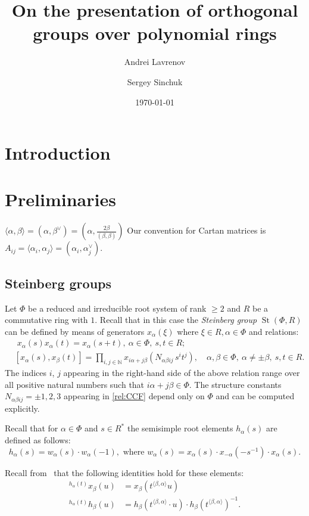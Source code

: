 \documentclass[oneside, 8pt]{amsart}
\title{On the presentation of orthogonal groups over polynomial rings}
\author{Andrei Lavrenov}
\author {Sergey Sinchuk}
\date {\today}
\theoremstyle{remark}
\theoremstyle{definition}
\DeclareMathOperator{\St}{St}
\numberwithin{equation}{section}
\begin{document}
\maketitle
\section{Introduction}


\section{Preliminaries}
$\langle \alpha, \beta \rangle = (\alpha, \beta^\vee) = (\alpha, \frac{2\beta}{(\beta, \beta)})$
Our convention for Cartan matrices is 
$A_{ij} = \langle \alpha_i, \alpha_j \rangle = (\alpha_i, \alpha_j^\vee)$.

\subsection{Steinberg groups}
Let $\Phi$ be a reduced and irreducible root system of rank $\geq 2$ and $R$ be a commutative ring with $1$. Recall that in this case the \emph{Steinberg group} $\St(\Phi, R)$ can be defined by means of generators $x_{\alpha}(\xi)$ where $\xi\in R, \alpha\in\Phi$ and relations:
\begin{align}
& \phantom{[}
x_\alpha(s) x_\alpha(t) = x_\alpha(s+t),\ \alpha\in\Phi,\ s,t\in R; \label{rel:add}\\
& [x_\alpha(s), x_\beta(t)] = \prod\limits_{i,j\in\mathbb{N}}
 x_{i\alpha + j\beta}\left(N_{\alpha\beta ij}\, s^i t^j\right),\quad \alpha,\beta\in\Phi,\ \alpha\neq\pm\beta,\ s,t\in R. \label{rel:CCF}
\end{align}
The indices $i$, $j$ appearing in the right-hand side of the above relation range over
all positive natural numbers such that $i\alpha + j\beta\in\Phi$.
The structure constants $N_{\alpha \beta i j}=\pm 1,2,3$ appearing in \eqref{rel:CCF} depend only on $\Phi$ and can be computed explicitly.

Recall that for $\alpha\in\Phi$ and $s \in R^*$ the semisimple root elements $h_\alpha(s)$ are defined as follows: \[h_\alpha(s)=w_\alpha(s) \cdot w_\alpha(-1), \text{ where } w_\alpha(s) = x_\alpha(s) \cdot x_{-\alpha}(-s^{-1}) \cdot x_\alpha(s).\]

Recall from~\cite[Lemma~5.2]{Ma69} that the following identities hold for these elements:
 \begin{align} 
   \label{eq:conj-h-x} {}^{h_\alpha(t)}\!x_\beta(u) & = x_\beta(t^{\langle \beta,  \alpha \rangle}u) \\
   \label{eq:conj-h-h} {}^{h_\alpha(t)}\!h_\beta(u) & = h_\beta(t^{\langle \beta, \alpha \rangle} \cdot u) \cdot h_\beta(t^{\langle \beta,  \alpha \rangle})^{-1}.
 \end{align}
\end{document}
